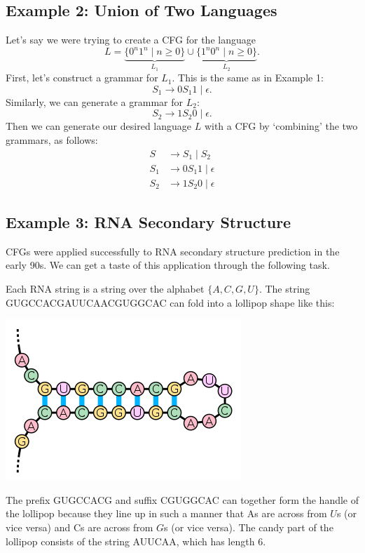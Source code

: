 \documentclass{article}
\begin{document}
\subsection*{Example 2: Union of Two Languages}
    Let's say we were trying to create a CFG for the language $$L = \underbrace{\{0^{n}1^{n} \mid n \ge 0\}}_{L_{1}} \cup \underbrace{\{1^{n}0^{n} \mid n \ge 0\}}_{L_{2}}.$$ First, let's construct a grammar for $L_{1}$. This is the same as in Example 1: $$S_{1} \rightarrow 0S_{1}1 \mid \epsilon.$$ Similarly, we can generate a grammar for $L_{2}$: $$S_{2} \rightarrow 1S_{2}0 \mid \epsilon.$$ Then we can generate our desired language $L$ with a CFG by `combining' the two grammars, as follows:
    \begin{align*}
        S &\rightarrow S_{1} \mid S_{2} \\
        S_{1} &\rightarrow 0S_{1}1 \mid \epsilon \\
        S_{2} &\rightarrow 1S_{2}0 \mid \epsilon
    \end{align*}


\subsection*{Example 3: RNA Secondary Structure}
        CFGs were applied successfully to RNA secondary structure prediction in the early 90s. We can get a taste of this application through the following task.
        
        \qquad Each RNA string is a string over the alphabet $\{A, C, G, U\}$. The string GUGCCACGAUUCAACGUGGCAC can fold into a lollipop shape like this:
        \begin{center}
            \includegraphics[scale = 0.4]{images/stem-loop.png}
        \end{center}
        \qquad The prefix GUGCCACG and suffix CGUGGCAC can together form the handle of the lollipop because they line up in such a manner that As are across from $U$s (or vice versa) and Cs are across from $G$s (or vice versa). The candy part of the lollipop consists of the string AUUCAA, which has length 6.
\end{document}
